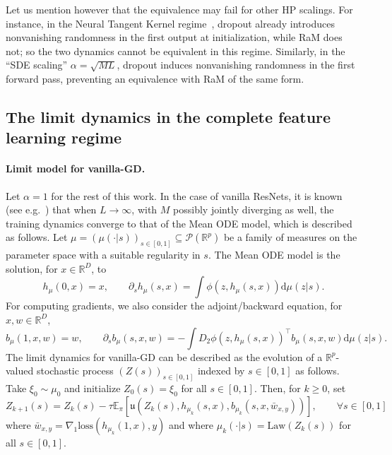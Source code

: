 \documentclass[a4paper,11pt]{article}
\newcommand{\R}{\mathbb{R}}
\newcommand{\1}{\mathbbm{1}}
\newcommand{\E}{\mathbb{E}}
\renewcommand{\d}{\mathrm{d}}
\theoremstyle{definition}
\theoremstyle{remark}
\begin{document}
Let us mention however that the equivalence may fail for other HP scalings. For instance, in the Neural Tangent Kernel regime~\cite{jacot2020neuraltangentkernelconvergence}, dropout already introduces nonvanishing randomness in the first output at initialization, while RaM does not; so the two dynamics cannot be equivalent in this regime. Similarly, in the ``SDE scaling'' $\alpha =\sqrt{ML}$, dropout induces nonvanishing randomness in the first forward pass, preventing an equivalence with RaM of the same form.

\subsection{The limit dynamics in the complete feature learning regime}\label{subsec:limit}

\paragraph{Limit model for vanilla-GD.}
Let $\alpha=1$ for the rest of this work.
In the case of vanilla ResNets, it is known (see e.g.~\cite{chizat2025hidden}) that when $L\to \infty$, with $M$ possibly jointly diverging as well, the training dynamics converge to that of the Mean ODE model, which is described as follows.
Let $\mu = {(\mu(\cdot|s))}_{s\in[0,1]} \subseteq \mathcal{P}(\R^p)$ be a family of measures on the parameter space with a suitable regularity in $s$. The Mean ODE model is the solution, for $x\in \R^D$, to
\begin{equation}\label{eq:mean_ode}
    h_\mu(0, x) = x, \qquad 
    \partial_s h_\mu(s, x) = \int \phi(z, h_\mu(s, x))\d \mu(z|s).
\end{equation} 
For computing gradients, we also consider the adjoint/backward equation, for $x,w\in \R^D$,
\begin{equation}\label{eq:backward_mean_ode}
    b_\mu(1, x,w) = w, \qquad 
    \partial_s b_\mu(s, x,w) = -\int {D_2\phi(z, h_\mu(s,x))}^{\top} b_\mu(s, x,w) \d \mu(z|s).
\end{equation}
The limit dynamics for vanilla-GD can be described as the evolution of a $\mathbb{R}^p$-valued stochastic process $(Z(s))_{s\in [0,1]}$ indexed by $s\in [0,1]$ as follows. Take $\xi_0 \sim \mu_0$ and initialize $Z_0(s) = \xi_0$ for all $s\in[0,1]$. Then, for $k\geq 0$, set
\[Z_{k+1}(s) = Z_k(s) - \tau \E_{\pi}[\mathfrak{u}(Z_k(s), h_{\mu_k}(s, x), b_{\mu_k}(s, x, \bar{w}_{x,y}))], \qquad \forall s\in [0,1]\]
where \(\bar{w}_{x,y} = \nabla_1 \mathrm{loss}(h_{\mu_k}(1, x), y)\) and where $\mu_k(\cdot|s) = \mathrm{Law}(Z_k(s))$ for all $s\in[0,1]$.
\end{document}
